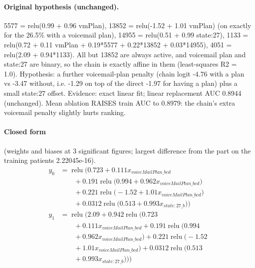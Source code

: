 \documentclass[a4paper,10pt]{article}
\newif\ifreviewmarks
\newcommand{\reviewrule}{\noindent{\color{BrickRed}\rule{\linewidth}{0.8pt}}}
\newenvironment{drafted}[1][]{%
  \ifreviewmarks\par\addvspace{\medskipamount}\reviewrule\par\nopagebreak
  \noindent{\color{BrickRed}\sffamily\footnotesize\textbf{Thesis Draft}\quad #1\hfill review}\par\nopagebreak\smallskip\fi}{%
  \ifreviewmarks\par\smallskip\noindent{\color{BrickRed}\sffamily\footnotesize end of thesis draft}\par\nopagebreak\reviewrule\par\medskip\fi}
\begin{document}
\begin{drafted}[plain-language layer: churn100-s2-c2]
\paragraph{Original hypothesis (unchanged).} 5577 = relu(0.99 + 0.96 vmPlan), 13852 = relu(-1.52 + 1.01 vmPlan) (on exactly for the 26.5\% with a voicemail plan), 14955 = relu(0.51 + 0.99 state:27), 1133 = relu(0.72 + 0.11 vmPlan + 0.19*5577 + 0.22*13852 + 0.03*14955), 4051 = relu(2.09 + 0.94*1133). All but 13852 are always active, and voicemail plan and state:27 are binary, so the chain is exactly affine in them (least-squares R2 = 1.0). Hypothesis: a further voicemail-plan penalty (chain logit -4.76 with a plan vs -3.47 without, i.e. -1.29 on top of the direct -1.97 for having a plan) plus a small state:27 offset. Evidence: exact linear fit; linear replacement AUC 0.8944 (unchanged). Mean ablation RAISES train AUC to 0.8979: the chain's extra voicemail penalty slightly hurts ranking.
\paragraph{Closed form} {\footnotesize(weights and biases at 3 significant figures; largest difference from the part on the training patients 2.22045e-16).}
{\small\begingroup\allowdisplaybreaks
\begin{align*}
y_{0} &= \operatorname{relu}\bigl(0.723 + 0.111 x_{voiceMailPlan\_bcd} \\
&\qquad + 0.191 \operatorname{relu}\bigl(0.994 + 0.962 x_{voiceMailPlan\_bcd}\bigr) \\
&\qquad + 0.221 \operatorname{relu}\bigl(-1.52 + 1.01 x_{voiceMailPlan\_bcd}\bigr) \\
&\qquad + 0.0312 \operatorname{relu}\bigl(0.513 + 0.993 x_{state:27\_b}\bigr)\bigr) \\
y_{1} &= \operatorname{relu}\bigl(2.09 + 0.942 \operatorname{relu}\bigl(0.723 \\
&\qquad + 0.111 x_{voiceMailPlan\_bcd} + 0.191 \operatorname{relu}\bigl(0.994 \\
&\qquad + 0.962 x_{voiceMailPlan\_bcd}\bigr) + 0.221 \operatorname{relu}\bigl(-1.52 \\
&\qquad + 1.01 x_{voiceMailPlan\_bcd}\bigr) + 0.0312 \operatorname{relu}\bigl(0.513 \\
&\qquad + 0.993 x_{state:27\_b}\bigr)\bigr)\bigr)
\end{align*}\endgroup}


\end{drafted}
\end{document}
